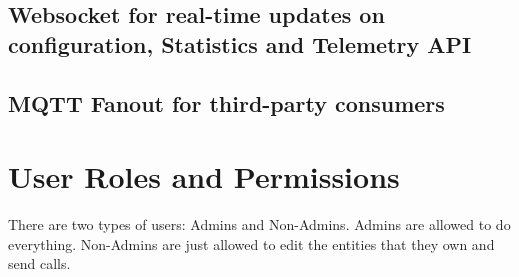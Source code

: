 \subsection{Websocket for real-time updates on configuration, Statistics and Telemetry API}

\subsection{MQTT Fanout for third-party consumers}

\section{User Roles and Permissions}
There are two types of users: Admins and Non-Admins. Admins are allowed to do everything. Non-Admins are just allowed to edit the entities that they own and send calls.
